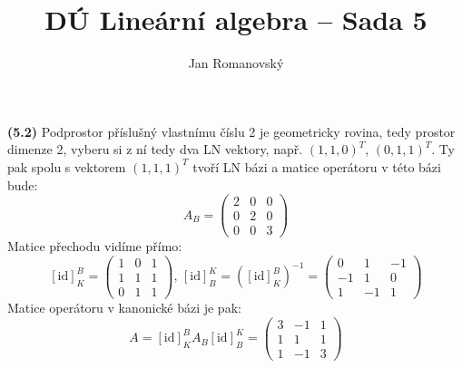 \documentclass{article}
\title{DÚ Lineární algebra -- Sada 5}
\author{Jan Romanovský}
\begin{document}
\maketitle

\textbf{(5.2)} Podprostor příslušný vlastnímu číslu 2 je geometricky rovina, tedy prostor dimenze 2, vyberu si z ní tedy dva LN vektory, např. $\left(1, 1, 0\right)^T$, $\left(0, 1, 1\right)^T$. Ty pak spolu s vektorem $\left(1, 1, 1\right)^T$ tvoří LN bázi a matice operátoru v této bázi bude:
$$A_B = \begin{pmatrix}
   2 & 0 & 0 \\ 0 & 2 & 0 \\ 0 & 0 & 3
\end{pmatrix}$$
Matice přechodu vidíme přímo:
$$[\text{id}]_K^B = \begin{pmatrix}
    1 & 0 & 1 \\ 1 & 1 & 1 \\ 0 & 1 & 1
\end{pmatrix},\, [\text{id}]_B^K = ([\text{id}]_K^B)^{-1} = \begin{pmatrix}
   0 & 1 & -1 \\ -1 & 1 & 0 \\ 1 & -1 & 1
\end{pmatrix}$$
Matice operátoru v kanonické bázi je pak:
$$A = [\text{id}]_K^BA_B[\text{id}]_B^K = \begin{pmatrix}
    3 & -1 & 1 \\ 1 & 1 & 1 \\ 1 & -1 & 3
\end{pmatrix}$$
\end{document}
